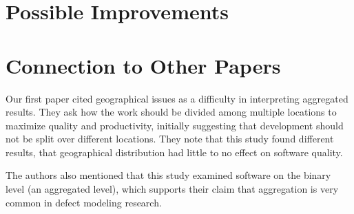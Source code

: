 \documentclass[english]{article}
\begin{document}
\section*{Possible Improvements}

\section*{Connection to Other Papers}
	Our first paper \cite{posnett11} cited geographical issues as a difficulty in interpreting aggregated results. They ask how the work should be divided among multiple locations to maximize quality and productivity, initially suggesting that development should not be split over different locations. They note that this study found different results, that geographical distribution had little to no effect on software quality. 

The authors also mentioned that this study examined software on the binary level (an aggregated level), which supports their claim that aggregation is very common in defect modeling research.




\end{document}
